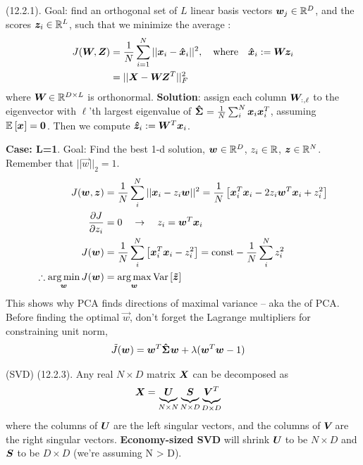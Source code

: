 \documentclass[11pt]{article}
\begin{document}
\myspace
\p {} (12.2.1). Goal: find an orthogonal set of $L$ linear basis vectors $\vec[j]{w} \in \R^D$, and the scores $\vec[i]{z} \in \R^L$, such that we minimize the average :
\begin{align}
	J(\matr W, \matr Z)
		&= \inv{N} \sum_{i=1}^{N} || \vec[i]{x} - \vec[i]{\hat x} ||^2, 
		\quad\text{where}\quad
		\vec[i]{\hat x} := \matr W \vec[i]{z} \\
		&= || \matr X - \matr W \matr{Z}^T ||_F^2
\end{align}
where $\matr W \in \R^{D \times L}$ is orthonormal. \textbf{Solution}: assign each column $\matr[:,\ell]{W}$ to the eigenvector with $\ell$'th largest eigenvalue of $\matr{\hat \Sigma} = \inv{N} \sum_i^N \vec[i]{x}\vec[i]{x}^T$, assuming $\E{\vec x} = \vec{0}$. Then we compute $\vec[i]{\hat z} := \matr{W}^T \vec[i]{x}$. 

\begin{example}
	\textbf{Case: L=1}. Goal: Find the best 1-d solution, $\vec{w} \in \R^D$, $z_i \in \R$, $\vec z \in \R^N$. Remember that $||\vec w||_2 = 1$. 
	\begin{align}
		J(\vec w, \vec{z})
			&= \inv{N} \sum_i^N || \vec[i]{x} - z_i \vec{w} ||^2 
			= \inv{N} \left[   \vec[i]{x}^T \vec[i]{x} - 2 z_i \vec{w}^T \vec[i]{x} + z_i^2  \right] \\
		\pderiv{J}{z_i}
			&= 0 \quad\rightarrow\quad z_i = \vec{w}^T\vec[i]{x} \\
		J(\vec w)
			&= \inv{N}\sum_i^N \left[ \vec[i]{x}^T\vec[i]{x} - z_i^2 \right]
			= \text{const} - \inv{N} \sum_i^N z_i^2 \\
		\therefore
		\argmin_{\vec w} J(\vec w) 
			&= \argmax_{\vec w} \text{Var}\left[  \vec{\tilde z} \right]
	\end{align}
	This shows why PCA finds directions of maximal variance -- aka the  of PCA. Before finding the optimal $\vec w$, don't forget the Lagrange multipliers for constraining unit norm,
	\begin{align}
		\tilde{J}(\vec w)
			&= \vec{w}^T \matr{\hat \Sigma} \vec{w} + \lambda (\vec{w}^T \vec w - 1)
	\end{align}
\end{example}

\myspace
\p {} (SVD) (12.2.3). Any real $N \times D$ matrix $\matr X$ can be decomposed as
\begin{align}
	\matr X
		&= \underbrace{\matr U}_{N \times N} \underbrace{\matr S}_{N \times D} \underbrace{\matr{V}^T}_{D \times D}
\end{align}
where the columns of $\matr U$ are the left singular vectors, and the columns of $\matr V$ are the right singular vectors. \textbf{Economy-sized SVD} will shrink $\matr U$ to be $N \times D$ and $\matr S$ to be $D \times D$ (we're assuming N > D). 
\end{document}
